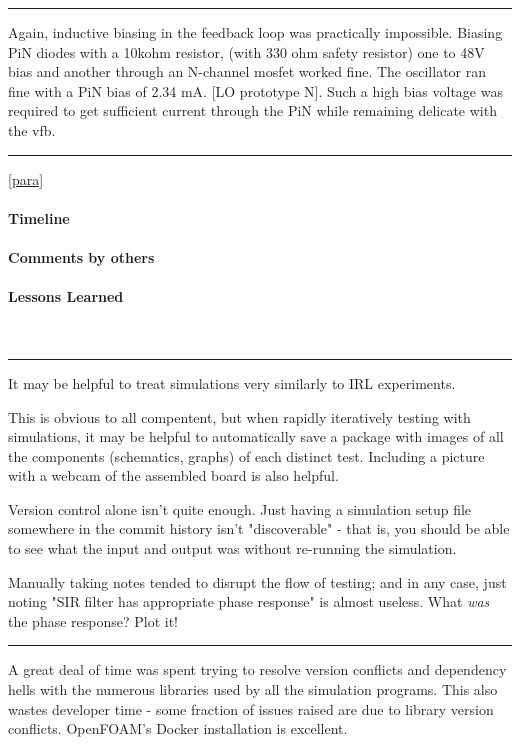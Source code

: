 \documentclass[fleqn,10pt]{article}
\begin{document}
\begin{multicols}{1}
\rule{\linewidth}{0.2pt}

Again, inductive biasing in the feedback loop was practically impossible. Biasing PiN diodes with a 10kohm resistor, (with 330 ohm safety resistor) one to 48V bias and another through an N-channel mosfet worked fine. The oscillator ran fine with a PiN bias of 2.34 mA. [LO prototype N]. Such a high bias voltage was required to get sufficient current through the PiN while remaining delicate with the vfb.

\rule{\linewidth}{0.2pt}

\label{para}
\ref{para}

\paragraph{Timeline}

\paragraph{Comments by others}

\paragraph{Lessons Learned} \


\rule{\linewidth}{0.2pt}

It may be helpful to treat simulations very similarly to IRL experiments. 

This is obvious to all compentent, but when rapidly iteratively testing with simulations, it may be helpful to automatically save a package with images of all the components (schematics, graphs) of each distinct test. Including a picture with a webcam of the assembled board is also helpful. 

Version control alone isn't quite enough. Just having a simulation setup file somewhere in the commit history isn't "discoverable" - that is, you should be able to see what the input and output was without re-running the simulation. 

Manually taking notes tended to disrupt the flow of testing; and in any case, just noting "SIR filter has appropriate phase response" is almost useless. What {\it was} the phase response? Plot it!

\rule{\linewidth}{0.2pt}

A great deal of time was spent trying to resolve version conflicts and dependency hells with the numerous libraries used by all the simulation programs. This also wastes developer time - some fraction of issues raised are due to library version conflicts. OpenFOAM's Docker installation is excellent.


\end{multicols}
\end{document}
